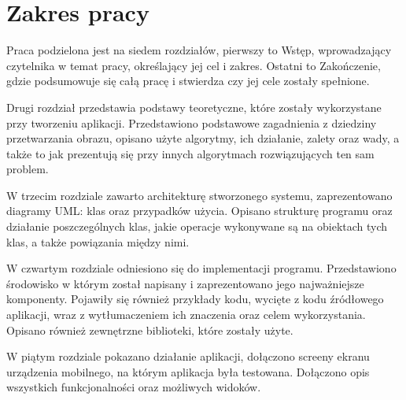 \documentclass[eng,oneside]{mgr}
\begin{document}
\section{Zakres pracy}
Praca podzielona jest na siedem rozdziałów, pierwszy to Wstęp, wprowadzający czytelnika w temat pracy, określający jej cel i zakres. Ostatni to Zakończenie, gdzie podsumowuje się całą pracę i stwierdza czy jej cele zostały spełnione. 
\par Drugi rozdział przedstawia podstawy teoretyczne, które zostały wykorzystane przy tworzeniu aplikacji. Przedstawiono podstawowe zagadnienia z dziedziny przetwarzania obrazu, opisano użyte algorytmy, ich działanie, zalety oraz wady, a także to jak prezentują się przy innych algorytmach rozwiązujących ten sam problem.
\par W trzecim rozdziale zawarto architekturę stworzonego systemu, zaprezentowano diagramy UML: klas oraz przypadków użycia. Opisano strukturę programu oraz działanie poszczególnych klas, jakie operacje wykonywane są na obiektach tych klas, a także powiązania między nimi. 
\par W czwartym rozdziale odniesiono się do implementacji programu. Przedstawiono środowisko w którym został napisany i zaprezentowano jego najważniejsze komponenty. Pojawiły się również przykłady kodu, wycięte z kodu źródłowego aplikacji, wraz z wytłumaczeniem ich znaczenia oraz celem wykorzystania. Opisano również zewnętrzne biblioteki, które zostały użyte.
\par W piątym rozdziale pokazano działanie aplikacji, dołączono screeny ekranu urządzenia mobilnego, na którym aplikacja była testowana. Dołączono opis wszystkich funkcjonalności oraz możliwych widoków. 
\end{document}
